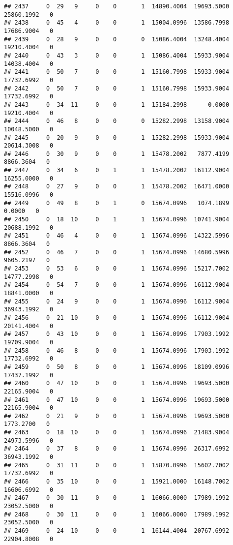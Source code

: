 \documentclass[
]{article}
\begin{document}
\begin{enumerate}
\begin{verbatim}
## 2437     0  29   9     0    0       1  14890.4004  19693.5000  25860.1992   0
## 2438     0  45   4     0    0       1  15004.0996  13586.7998  17686.9004   0
## 2439     0  28   9     0    0       0  15086.4004  13248.4004  19210.4004   0
## 2440     0  43   3     0    0       1  15086.4004  15933.9004  14038.4004   0
## 2441     0  50   7     0    0       1  15160.7998  15933.9004  17732.6992   0
## 2442     0  50   7     0    0       1  15160.7998  15933.9004  17732.6992   0
## 2443     0  34  11     0    0       1  15184.2998      0.0000  19210.4004   0
## 2444     0  46   8     0    0       0  15282.2998  13158.9004  10048.5000   0
## 2445     0  20   9     0    0       1  15282.2998  15933.9004  20614.3008   0
## 2446     0  30   9     0    0       1  15478.2002   7877.4199   8866.3604   0
## 2447     0  34   6     0    1       1  15478.2002  16112.9004  16255.0000   0
## 2448     0  27   9     0    0       1  15478.2002  16471.0000  15516.0996   0
## 2449     0  49   8     0    1       0  15674.0996   1074.1899      0.0000   0
## 2450     0  18  10     0    1       1  15674.0996  10741.9004  20688.1992   0
## 2451     0  46   4     0    0       1  15674.0996  14322.5996   8866.3604   0
## 2452     0  46   7     0    0       1  15674.0996  14680.5996   9605.2197   0
## 2453     0  53   6     0    0       1  15674.0996  15217.7002  14777.2998   0
## 2454     0  54   7     0    0       1  15674.0996  16112.9004  18841.0000   0
## 2455     0  24   9     0    0       1  15674.0996  16112.9004  36943.1992   0
## 2456     0  21  10     0    0       1  15674.0996  16112.9004  20141.4004   0
## 2457     0  43  10     0    0       1  15674.0996  17903.1992  19709.9004   0
## 2458     0  46   8     0    0       1  15674.0996  17903.1992  17732.6992   0
## 2459     0  50   8     0    0       1  15674.0996  18109.0996  17437.1992   0
## 2460     0  47  10     0    0       1  15674.0996  19693.5000  22165.9004   0
## 2461     0  47  10     0    0       1  15674.0996  19693.5000  22165.9004   0
## 2462     0  21   9     0    0       1  15674.0996  19693.5000   1773.2700   0
## 2463     0  18  10     0    0       1  15674.0996  21483.9004  24973.5996   0
## 2464     0  37   8     0    0       1  15674.0996  26317.6992  36943.1992   0
## 2465     0  31  11     0    0       1  15870.0996  15602.7002  17732.6992   0
## 2466     0  35  10     0    0       1  15921.0000  16148.7002  16606.6992   0
## 2467     0  30  11     0    0       1  16066.0000  17989.1992  23052.5000   0
## 2468     0  30  11     0    0       1  16066.0000  17989.1992  23052.5000   0
## 2469     0  24  10     0    0       1  16144.4004  20767.6992  22904.8008   0

\end{verbatim}
\end{enumerate}
\end{document}
